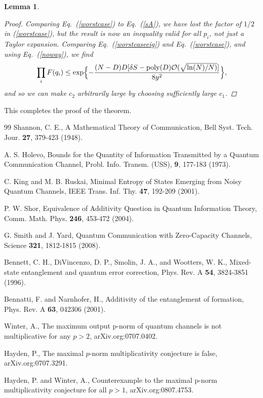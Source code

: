 \documentclass[aps,prl,amsmath,amssymb,amsfonts,superscriptaddress,floatfix]{revtex4}
\newtheorem{lemma}{Lemma}
\newcommand{\be}{\begin{equation}}
\newcommand{\ee}{\end{equation}}
\newcommand{\FF}{F}
\begin{document}
\begin{lemma}
\begin{proof}
Comparing Eq.~(\ref{worstcase}) to Eq.~(\ref{sA}), we have lost the factor
of $1/2$ in (\ref{worstcase}), but the result is now an inequality valid for
all $p_i$, not just a Taylor expansion.
Comparing Eq.~(\ref{worstcaseeig}) and Eq.~(\ref{worstcase}),
and using Eq.~(\ref{noway}), we find
\be
\prod_i \FF(q_i)\leq \exp\Bigl\{-\frac{(N-D) D [\delta S-{\rm poly}(D){\cal O}(\sqrt{\ln(N)/N)}]}{8y^2}\Bigr\},
\ee
and so we can make $c_2$ arbitrarily large by choosing sufficiently large $c_1$.




\end{proof}
\end{lemma}
This completes the proof of the theorem.

\begin{thebibliography}{99}
 Shannon, C. E., A Mathematical Theory of
Communication, Bell Syst. Tech. Jour. {\bf 27}, 379-423 (1948).

 A. S. Holevo, Bounds for the Quantity of Information
Transmitted by a Quantum Communication Channel,
Probl. Info. Transm. (USS), {\bf 9}, 177-183 (1973).

 C. King and M. B. Ruskai, Minimal Entropy of States Emerging
from Noisy Quantum Channels, IEEE Trans. Inf. Thy. {\bf 47}, 192-209 (2001).

 P. W. Shor, Equivalence of Additivity Question
in Quantum Information Theory, Comm. Math. Phys. {\bf 246}, 453-472 (2004).

 G. Smith and J. Yard, Quantum Communication with Zero-Capacity
Channels, Science {\bf 321}, 1812-1815 (2008).

 Bennett, C. H., DiVincenzo, D. P., Smolin, J. A., and Wootters, W. K., Mixed-state
entanglement and quantum error correction, Phys. Rev. A {\bf 54}, 3824-3851 (1996).

 Bennatti, F. and Narnhofer, H., Additivity of the entanglement of formation,
Phys. Rev. A {\bf 63}, 042306 (2001).

 Winter, A., The maximum output p-norm of quantum
channels is not multiplicative for any $p>2$, arXiv.org:0707.0402.

 Hayden, P., The maximal $p$-norm multiplicativity conjecture
is false, arXiv.org:0707.3291.

 Hayden, P. and Winter, A., Counterexample to the
maximal p-norm multiplicativity conjecture for all $p>1$,
arXiv.org:0807.4753.


\end{thebibliography}
\end{document}
